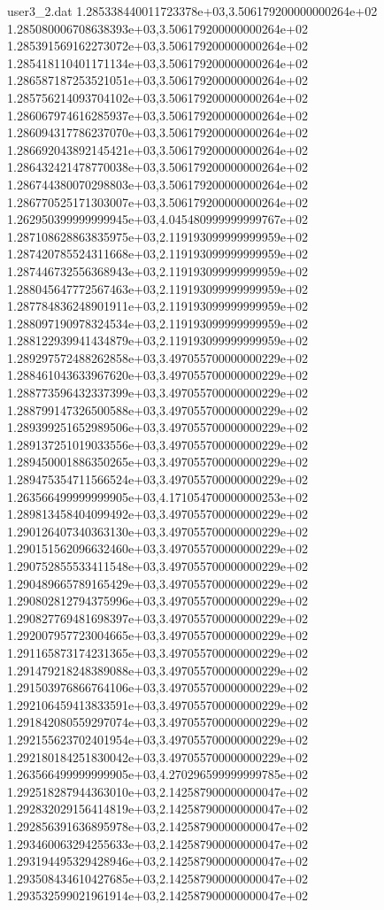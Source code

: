 \begin{filecontents}{user3_2.dat}
1.285338440011723378e+03,3.506179200000000264e+02
1.285080006708638393e+03,3.506179200000000264e+02
1.285391569162273072e+03,3.506179200000000264e+02
1.285418110401171134e+03,3.506179200000000264e+02
1.286587187253521051e+03,3.506179200000000264e+02
1.285756214093704102e+03,3.506179200000000264e+02
1.286067974616285937e+03,3.506179200000000264e+02
1.286094317786237070e+03,3.506179200000000264e+02
1.286692043892145421e+03,3.506179200000000264e+02
1.286432421478770038e+03,3.506179200000000264e+02
1.286744380070298803e+03,3.506179200000000264e+02
1.286770525171303007e+03,3.506179200000000264e+02
1.262950399999999945e+03,4.045480999999999767e+02
1.287108628863835975e+03,2.119193099999999959e+02
1.287420785524311668e+03,2.119193099999999959e+02
1.287446732556368943e+03,2.119193099999999959e+02
1.288045647772567463e+03,2.119193099999999959e+02
1.287784836248901911e+03,2.119193099999999959e+02
1.288097190978324534e+03,2.119193099999999959e+02
1.288122939941434879e+03,2.119193099999999959e+02
1.289297572488262858e+03,3.497055700000000229e+02
1.288461043633967620e+03,3.497055700000000229e+02
1.288773596432337399e+03,3.497055700000000229e+02
1.288799147326500588e+03,3.497055700000000229e+02
1.289399251652989506e+03,3.497055700000000229e+02
1.289137251019033556e+03,3.497055700000000229e+02
1.289450001886350265e+03,3.497055700000000229e+02
1.289475354711566524e+03,3.497055700000000229e+02
1.263566499999999905e+03,4.171054700000000253e+02
1.289813458404099492e+03,3.497055700000000229e+02
1.290126407340363130e+03,3.497055700000000229e+02
1.290151562096632460e+03,3.497055700000000229e+02
1.290752855533411548e+03,3.497055700000000229e+02
1.290489665789165429e+03,3.497055700000000229e+02
1.290802812794375996e+03,3.497055700000000229e+02
1.290827769481698397e+03,3.497055700000000229e+02
1.292007957723004665e+03,3.497055700000000229e+02
1.291165873174231365e+03,3.497055700000000229e+02
1.291479218248389088e+03,3.497055700000000229e+02
1.291503976866764106e+03,3.497055700000000229e+02
1.292106459413833591e+03,3.497055700000000229e+02
1.291842080559297074e+03,3.497055700000000229e+02
1.292155623702401954e+03,3.497055700000000229e+02
1.292180184251830042e+03,3.497055700000000229e+02
1.263566499999999905e+03,4.270296599999999785e+02
1.292518287944363010e+03,2.142587900000000047e+02
1.292832029156414819e+03,2.142587900000000047e+02
1.292856391636895978e+03,2.142587900000000047e+02
1.293460063294255633e+03,2.142587900000000047e+02
1.293194495329428946e+03,2.142587900000000047e+02
1.293508434610427685e+03,2.142587900000000047e+02
1.293532599021961914e+03,2.142587900000000047e+02

\end{filecontents}
